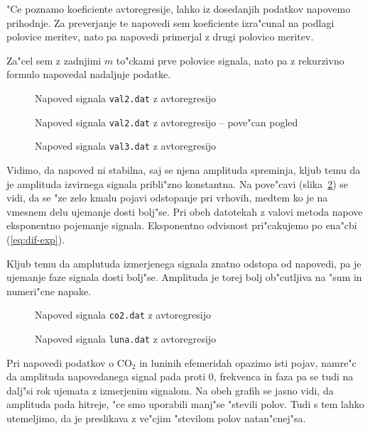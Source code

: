 \documentclass[a4paper,10pt]{article}
\begin{document}
"Ce poznamo koeficiente avtoregresije, lahko iz dosedanjih podatkov napovemo prihodnje. Za preverjanje te napovedi sem koeficiente izra"cunal na podlagi polovice meritev, nato pa napovedi primerjal z drugi polovico meritev. 

Za"cel sem z zadnjimi $m$ to"ckami prve polovice signala, nato pa z rekurzivno formulo napovedal nadaljnje podatke. 

\begin{figure}[H]
 \centering
 \caption{Napoved signala \texttt{val2.dat} z avtoregresijo}
 \label{fig:napoved-val2}
\end{figure}

\begin{figure}[H]
 \centering
 \caption{Napoved signala \texttt{val2.dat} z avtoregresijo -- pove"can pogled}
 \label{fig:napoved-val2-zoom}
\end{figure}

\begin{figure}[H]
 \centering
 \caption{Napoved signala \texttt{val3.dat} z avtoregresijo}
 \label{fig:napoved-val3}
\end{figure}

Vidimo, da napoved ni stabilna, saj se njena amplituda spreminja, kljub temu da je amplituda izvirnega signala pribli"zno konstantna. Na pove"cavi (slika~\ref{fig:napoved-val2-zoom}) se vidi, da se "ze zelo kmalu pojavi odstopanje pri vrhovih, medtem ko je na vmesnem delu ujemanje dosti bolj"se. Pri obeh datotekah z valovi metoda napove eksponentno pojemanje signala. Eksponentno odvisnost pri"cakujemo po ena"cbi (\ref{eq:dif-exp}). 

Kljub temu da amplutuda izmerjenega signala znatno odstopa od napovedi, pa je ujemanje faze signala dosti bolj"se. Amplituda je torej bolj ob"cutljiva na "sum in numeri"cne napake. 

\begin{figure}[H]
 \centering
 \caption{Napoved signala \texttt{co2.dat} z avtoregresijo}
 \label{fig:napoved-co2}
\end{figure}

\begin{figure}[H]
 \centering
 \caption{Napoved signala \texttt{luna.dat} z avtoregresijo}
 \label{fig:napoved-luna}
\end{figure}

Pri napovedi podatkov o CO$_2$ in luninih efemeridah opazimo isti pojav, namre"c da amplituda napovedanega signal pada proti 0, frekvenca in faza pa se tudi na dalj"si rok ujemata z izmerjenim signalom. Na obeh grafih se jasno vidi, da amplituda pada hitreje, "ce smo uporabili manj"se "stevili polov. Tudi s tem lahko utemeljimo, da je preslikava z ve"cjim "stevilom polov natan"cnej"sa. 
\end{document}
